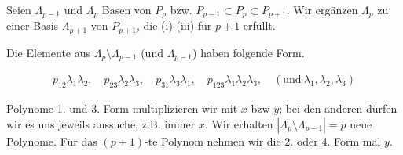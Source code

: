 \begin{solution}
\begin{enumerate}[label = \textbf{\alph*)}]
  Seien $\Lambda_{p-1}$ und $\Lambda_p$ Basen von $P_p$ bzw. $P_{p-1} \subset P_p \subset P_{p+1}$.
  Wir ergänzen $\Lambda_p$ zu einer Basis $\Lambda_{p+1}$ von $P_{p+1}$, die (i)-(iii) für $p+1$ erfüllt.

  Die Elemente aus $\Lambda_p \setminus \Lambda_{p-1}$ (und $\Lambda_{p-1}$) haben folgende Form.

  \begin{align*}
    p_{12} \lambda_1 \lambda_2,
    \quad
    p_{23} \lambda_2 \lambda_3,
    \quad
    p_{31} \lambda_3 \lambda_1,
    \quad
    p_{123} \lambda_1 \lambda_2 \lambda_3,
    \quad
    (\text{und}~ \lambda_1, \lambda_2, \lambda_3)
  \end{align*}

  Polynome 1. und 3. Form multiplizieren wir mit $x$ bzw $y$;
  bei den anderen dürfen wir es uns jeweils aussuche, z.B. immer $x$.
  Wir erhalten $|\Lambda_p \setminus \Lambda_{p-1}| = p$ neue Polynome.
  Für das $(p+1)$-te Polynom nehmen wir die 2. oder 4. Form mal $y$.


\end{enumerate}
\end{solution}
